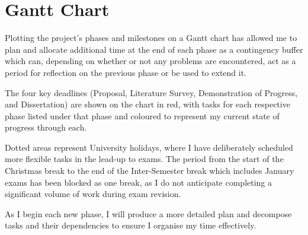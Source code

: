 \section{Gantt Chart}

Plotting the project's phases and milestones on a Gantt chart has allowed me to plan and allocate additional time at the end of each phase as a contingency buffer which can, depending on whether or not any problems are encountered, act as a period for reflection on the previous phase or be used to extend it.

The four key deadlines (Proposal, Literature Survey, Demonstration of Progress, and Dissertation) are shown on the chart in red, with tasks for each respective phase listed under that phase and coloured to represent my current state of progress through each.

Dotted areas represent University holidays, where I have deliberately scheduled more flexible tasks in the lead-up to exams. The period from the start of the Christmas break to the end of the Inter-Semester break which includes January exams has been blocked as one break, as I do not anticipate completing a significant volume of work during exam revision.

As I begin each new phase, I will produce a more detailed plan and decompose tasks and their dependencies to ensure I organise my time effectively.

